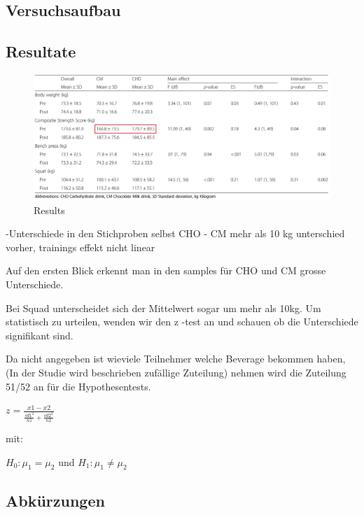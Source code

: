 \documentclass[
]{article}
\begin{document}
\hypertarget{versuchsaufbau}{%
\subsection{Versuchsaufbau}\label{versuchsaufbau}}

\hypertarget{resultate}{%
\subsection{Resultate}\label{resultate}}

\begin{figure}

{\centering \includegraphics[width=1\linewidth]{results} 

}

\caption{Results}\label{fig:results}
\end{figure}

-Unterschiede in den Stichproben selbst CHO - CM mehr als 10 kg
unterschied vorher, trainings effekt nicht linear

Auf den ersten Blick erkennt man in den samples für CHO und CM grosse
Unterschiede.

Bei Squad unterscheidet sich der Mittelwert sogar um mehr als 10kg. Um
statistisch zu urteilen, wenden wir den z -test an und schauen ob die
Unterschiede signifikant sind.

Da nicht angegeben ist wieviele Teilnehmer welche Beverage bekommen
haben, (In der Studie wird beschrieben zufällige Zuteilung) nehmen wird
die Zuteilung 51/52 an für die Hypothesentests.

\(z=\frac{x1-x2}{ \frac{sd1^{2}}{n1} + \frac{sd2^{2}}{n2} }\)

mit:

\(H_{0} : \mu_{1} = \mu_{2}\) und \(H_{1} : \mu_{1} \neq \mu_{2}\)

\newpage

\hypertarget{abkuxfcrzungen}{%
\subsection{Abkürzungen}\label{abkuxfcrzungen}}
\end{document}
